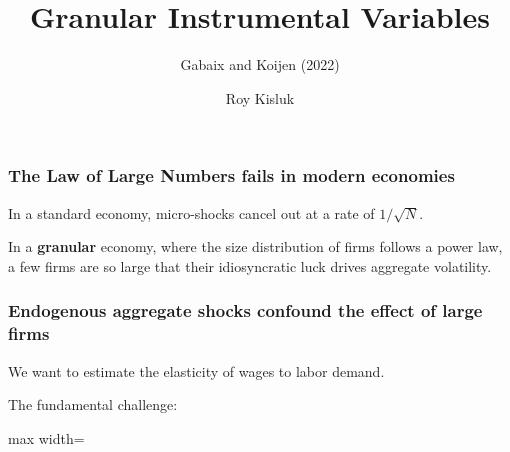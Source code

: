 \documentclass[aspectratio=169,11pt]{beamer}
\begin{document}
\begin{frame}
    \title{Granular Instrumental Variables}
    \subtitle{Gabaix and Koijen (2022)}
    \author{Roy Kisluk}
    \date{}
    \titlepage
\end{frame}



\begin{frame}
    \frametitle{The Law of Large Numbers fails in modern economies}

    \vspace{1cm}
    {\Large
        In a standard economy, micro-shocks cancel out at a rate of $1/\sqrt{N}$\hyperlink{sqrtn}{}.

    }

    \vspace{1cm}
    {\Large
        In a \textbf{granular} economy, where the size distribution of firms follows a power law, a few firms are so large that their idiosyncratic luck drives aggregate volatility.
    }

\end{frame}

\begin{frame}
    \frametitle{Endogenous aggregate shocks confound the effect of large firms}

    \vspace{0.5cm}
    {\Large
        We want to estimate the elasticity of wages to labor demand.
    }

    \vspace{0.5cm}
    {\Large
        The fundamental challenge:
    }
    \vspace{0.5cm}
    \begin{center}
        \begin{adjustbox}{max width=\textwidth}
        \end{adjustbox}
    \end{center}

\end{frame}
\end{document}
